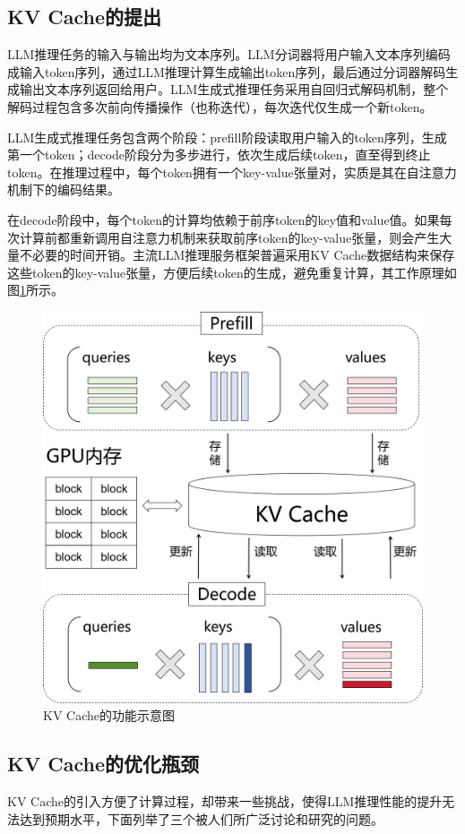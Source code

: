 \documentclass[a4paper, nosysfonts]{hpcchina}
\begin{document}
\subsection{KV Cache的提出}
LLM推理任务的输入与输出均为文本序列。LLM分词器将用户输入文本序列编码成输入token序列，通过LLM推理计算生成输出token序列，最后通过分词器解码生成输出文本序列返回给用户。LLM生成式推理任务采用自回归式解码机制，整个解码过程包含多次前向传播操作（也称迭代），每次迭代仅生成一个新token。 \par
LLM生成式推理任务包含两个阶段：prefill阶段读取用户输入的token序列，生成第一个token；decode阶段分为多步进行，依次生成后续token，直至得到终止token。在推理过程中，每个token拥有一个key-value张量对，实质是其在自注意力机制下的编码结果。 \par
在decode阶段中，每个token的计算均依赖于前序token的key值和value值。如果每次计算前都重新调用自注意力机制来获取前序token的key-value张量，则会产生大量不必要的时间开销。主流LLM推理服务框架普遍采用KV Cache数据结构来保存这些token的key-value张量，方便后续token的生成，避免重复计算，其工作原理如图\ref{KV Cache的功能示意图}所示。
\begin{figure}[!htbp]
  \renewcommand{\arraystretch}{1}
  \centering
  \includegraphics[width=0.9\linewidth]
  {KV Cache的功能示意图.png}
  \caption{KV Cache的功能示意图}
  \label{KV Cache的功能示意图}
\end{figure}

\subsection{KV Cache的优化瓶颈}
KV Cache的引入方便了计算过程，却带来一些挑战，使得LLM推理性能的提升无法达到预期水平，下面列举了三个被人们所广泛讨论和研究的问题。 
\end{document}
